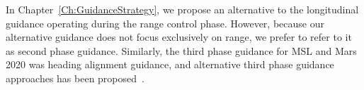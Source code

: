 In Chapter~\ref{Ch:GuidanceStrategy}, we propose an alternative to the longitudinal guidance operating during the range control phase. However, because our alternative guidance does not focus exclusively on range, we prefer to refer to it as second phase guidance. Similarly, the third phase guidance for MSL and Mars 2020 was heading alignment guidance, and alternative third phase guidance approaches has been proposed~\cite{GuangfeiDissertation}.





